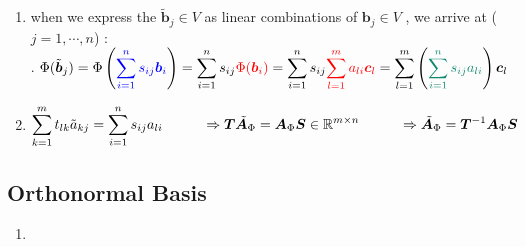 \begin{enumerate}
\begin{enumerate}
        \item when we express the $\tilde{\bm{b}}_j \in V$ as linear combinations of $\bm{b}_j \in V$ , we arrive at ($j = 1,\cdots, n$) :
        \hfill \cite{mfml/book/mml/Deisenroth-Faisal-Ong}
        \\
        .\hfill
        $
            \Phi (\tilde{\bm{b}}_j ) 
            = \Phi  \dParenBrac{ \textcolor{blue}{\dsum ^n _{i=1} s_{ij} \bm{b}_i}}
            = \dsum ^n _{i=1} s_{ij} \textcolor{red}{\Phi (\bm{b}_i)} 
            = \dsum^n _{i=1} s_{ij} \textcolor{red}{\dsum ^m _{l=1} a_{li} \bm{c}_l}
            = \dsum ^m _{l=1} \dParenBrac{ \textcolor{PineGreen}{\dsum^n _{i=1} s_{ij} a_{li}} } \bm{c}_l
        $
        \hfill \cite{mfml/book/mml/Deisenroth-Faisal-Ong}

        \item $
            \begin{aligned}
                \displaystyle\sum^m_{k=1} t_{lk} \tilde{a}_{kj} = \displaystyle\sum^n _{i=1} s_{ij} a_{li}
                \hspace{1cm}
                \Rightarrow 
                \bm{T} \tilde{\bm{A}}_\Phi = \bm{A}_\Phi \bm{S} 
                \in \mathbb{R}^{m\times n}
                \hspace{1cm}
                \Rightarrow 
                \tilde{\bm{A}}_\Phi = \bm{T}^{-1} \bm{A}_\Phi \bm{S}
            \end{aligned}
        $
        \hfill \cite{mfml/book/mml/Deisenroth-Faisal-Ong}        
    \end{enumerate}

    
\end{enumerate}






\subsection{Orthonormal Basis}


\begin{enumerate}
    \item 
\end{enumerate}




























